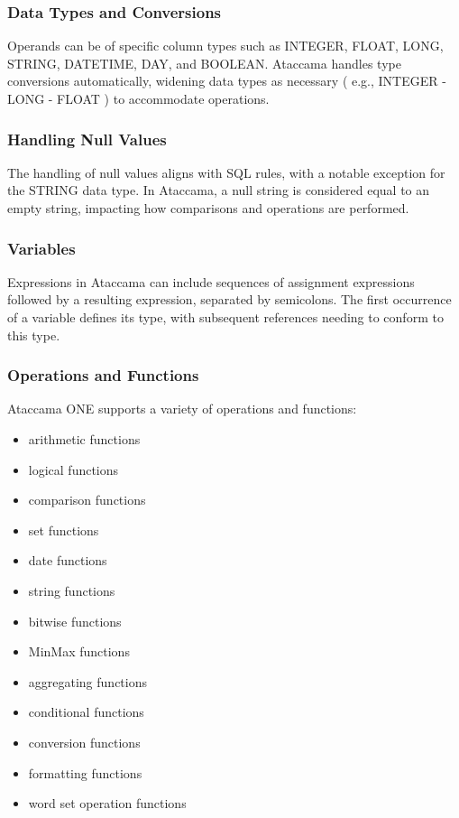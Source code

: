     \subsubsection{Data Types and Conversions}
    
    Operands can be of specific column types such as INTEGER, FLOAT, LONG, STRING, DATETIME, DAY, and BOOLEAN. Ataccama handles type conversions automatically, widening data types as necessary ( e.g., INTEGER - LONG - FLOAT ) to accommodate operations.

    \subsubsection{Handling Null Values}

    The handling of null values aligns with SQL rules, with a notable exception for the STRING data type. In Ataccama, a null string is considered equal to an empty string, impacting how comparisons and operations are performed.

    \subsubsection{Variables}

    Expressions in Ataccama can include sequences of assignment expressions followed by a resulting expression, separated by semicolons. The first occurrence of a variable defines its type, with subsequent references needing to conform to this type.

    \subsubsection{Operations and Functions}
    
    Ataccama ONE supports a variety of operations and functions:

    \begin{itemize}
        \item arithmetic functions
        \item logical functions
        \item comparison functions
        \item set functions
        \item date functions
        \item string functions
        \item bitwise functions
        \item MinMax functions
        \item aggregating functions
        \item conditional functions
        \item conversion functions
        \item formatting functions
        \item word set operation functions
    \end{itemize}

